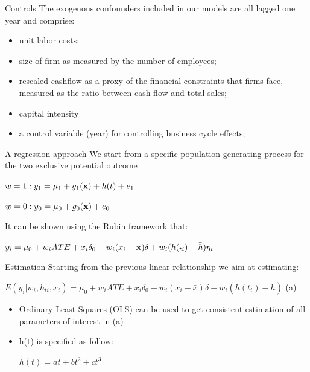\documentclass[10pt,handout,xcolor=pdftex,dvipsnames,table]{beamer}
\begin{document}
\begin{frame}{Controls}
 The exogenous confounders included in our models are all lagged one year and comprise:
\begin{itemize}
\item unit labor costs;
\item 	size of firm as measured by the number of employees;
\item	rescaled cashflow as a proxy of the financial constraints that firms face, measured as the ratio between cash flow and total sales;
\item capital intensity 
\item a control variable (year) for controlling business cycle effects;
\end{itemize}

\end{frame}
\begin{frame}{A regression approach}
We start from a specific population generating process for the two exclusive potential outcome



$w=1: y_1=\mu_1+g_1({\bf x})+h(t)+e_1$ 

$w=0: y_0=\mu_0+g_0({\bf x})+e_0$

It can be shown using the Rubin framework that: 

$y_i= \mu_0+w_i ATE+x_i\delta_0+w_i (x_i -{\bf x})\delta+w_i (h(_{ti})-\bar{h})\eta_i  $
\end{frame}
\begin{frame}{Estimation}
Starting from the previous linear relationship we aim at estimating:

$ E(y_i | w_i,h_{ti},x_i)=\mu_0+w_i ATE+x_i\delta_0+w_i(x_i-\bar{x} )\delta+w_i(h(t_i)-\bar{h})  $ (a)

\begin{itemize}
\item Ordinary Least Squares (OLS) can be used to get consistent estimation of all parameters of interest in (a)
\item  h(t) is specified as follow:

$h(t)=a t+ b t^2 + ct^3$

\end{itemize}



\end{frame}
\end{document}
